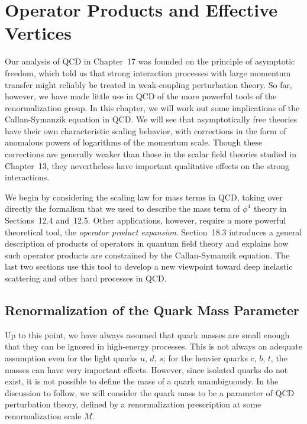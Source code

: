 \chapter{Operator Products and Effective Vertices}

Our analysis of QCD in Chapter~17 was founded on the principle of asymptotic
freedom, which told us that strong interaction processes with large momentum
transfer might reliably be treated in weak-coupling perturbation theory.  So
far, however, we have made little use in QCD of the more powerful tools of
the renormalization group.  In this chapter, we will work out some
implications of the Callan-Symanzik equation in QCD.  We will see that
asymptotically free theories have their own characteristic scaling behavior,
with corrections in the form of anomalous powers of logarithms of the
momentum scale.  Though these corrections are generally weaker than those in
the scalar field theories studied in Chapter~13, they nevertheless have
important qualitative effects on the strong interactions.

We begin by considering the scaling law for mass terms in QCD, taking over
directly the formalism that we used to describe the mass term of $\phi^4$
theory in Sections~12.4 and~12.5.  Other applications, however, require a
more powerful theoretical tool, the \emph{operator product expansion}.
Section~18.3 introduces a general description of products of operators in
quantum field theory and explains how such operator products are constrained
by the Callan-Symanzik equation.  The last two sections use this tool to
develop a new viewpoint toward deep inelastic scattering and other hard
processes in QCD.

\section{Renormalization of the Quark Mass Parameter}

Up to this point, we have always assumed that quark masses are small enough
that they can be ignored in high-energy processes.  This is not always an
adequate assumption even for the light quarks $u$, $d$, $s$; for the heavier
quarks $c$, $b$, $t$, the masses can have very important effects.  However,
since isolated quarks do not exist, it is not possible to define the mass of a
quark unambiguously.  In the discussion to follow, we will consider the quark
mass to be a parameter of QCD perturbation theory, defined by a
renormalization prescription at some renormalization scale $M$.

